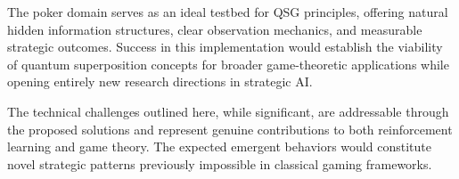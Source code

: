 \documentclass[11pt,a4paper]{article}
\begin{document}
The poker domain serves as an ideal testbed for QSG principles, offering natural hidden information structures, clear observation mechanics, and measurable strategic outcomes. Success in this implementation would establish the viability of quantum superposition concepts for broader game-theoretic applications while opening entirely new research directions in strategic AI.

The technical challenges outlined here, while significant, are addressable through the proposed solutions and represent genuine contributions to both reinforcement learning and game theory. The expected emergent behaviors would constitute novel strategic patterns previously impossible in classical gaming frameworks.



\end{document}
